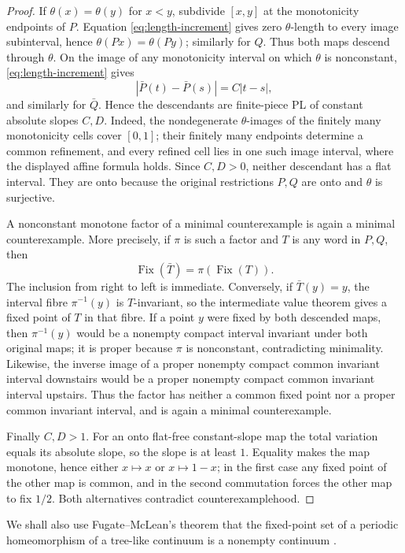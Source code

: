 \documentclass[11pt]{article}
\newcommand{\I}{[0,1]}
\newcommand{\Fix}{\operatorname{Fix}}
\begin{document}
\begin{proof}
If $\theta(x)=\theta(y)$ for $x<y$, subdivide $[x,y]$ at the monotonicity endpoints of $P$.
Equation \eqref{eq:length-increment} gives zero $\theta$-length to every image subinterval, hence
$\theta(Px)=\theta(Py)$; similarly for $Q$. Thus both maps descend through $\theta$. On the image
of any monotonicity interval on which $\theta$ is nonconstant, \eqref{eq:length-increment} gives
\[
|\bar P(t)-\bar P(s)|=C|t-s|,
\]
and similarly for $\bar Q$. Hence the descendants are finite-piece PL of constant absolute slopes
$C,D$. Indeed, the nondegenerate $\theta$-images of the finitely many monotonicity cells cover $\I$;
their finitely many endpoints determine a common refinement, and every refined cell lies in one such
image interval, where the displayed affine formula holds. Since $C,D>0$, neither descendant has a flat
interval. They are onto because the original restrictions $P,Q$ are onto and $\theta$ is surjective.

A nonconstant monotone factor of a minimal counterexample is again a minimal counterexample. More
precisely, if $\pi$ is such a factor and $T$ is any word in $P,Q$, then
\begin{equation}\label{eq:fixed-descent}
\Fix(\bar T)=\pi(\Fix(T)).
\end{equation}
The inclusion from right to left is immediate. Conversely, if $\bar T(y)=y$, the interval fibre
$\pi^{-1}(y)$ is $T$-invariant, so the intermediate value theorem gives a fixed point of $T$ in that
fibre. If a point $y$ were fixed by both descended maps, then $\pi^{-1}(y)$ would be a nonempty compact
interval invariant under both original maps; it is proper because $\pi$ is nonconstant, contradicting
minimality. Likewise, the inverse image of a proper nonempty compact common invariant interval downstairs
would be a proper nonempty compact common invariant interval upstairs. Thus the factor has neither a
common fixed point nor a proper common invariant interval, and is again a minimal counterexample.

Finally $C,D>1$. For an onto flat-free constant-slope map the total variation equals its absolute
slope, so the slope is at least $1$. Equality makes the map monotone, hence either $x\mapsto x$ or
$x\mapsto1-x$; in the first case any fixed point of the other map is common, and in the second
commutation forces the other map to fix $1/2$. Both alternatives contradict counterexamplehood.
\end{proof}

We shall also use Fugate--McLean's theorem that the fixed-point set of a periodic homeomorphism of a
tree-like continuum is a nonempty continuum \cite[Theorem~1.5, p.~613]{FugateMcLean}.
\end{document}

